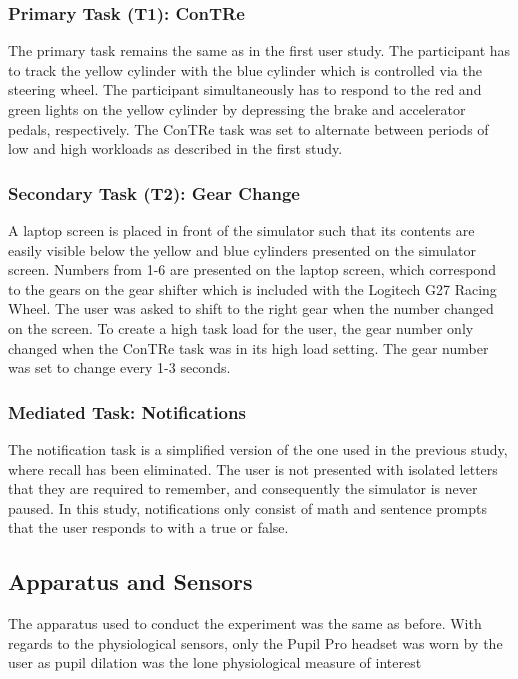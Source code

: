 \subsubsection{Primary Task (T1): ConTRe}
The primary task remains the same as in the first user study. The participant has to track the yellow cylinder with the blue cylinder which is controlled via the steering wheel. The participant simultaneously has to respond to the red and green lights on the yellow cylinder by depressing the brake and accelerator pedals, respectively. The ConTRe task was set to alternate between periods of low and high workloads as described in the first study. 


\subsubsection{Secondary Task (T2): Gear Change}
A laptop screen is placed in front of the simulator such that its contents are easily visible below the yellow and blue cylinders presented on the simulator screen. Numbers from 1-6 are presented on the laptop screen, which correspond to the gears on the gear shifter which is included with the Logitech G27 Racing Wheel. The user was asked to shift to the right gear when the number changed on the screen. To create a high task load for the user, the gear number only changed when the ConTRe task was in its high load setting. The gear number was set to change every 1-3 seconds. 

\subsubsection{Mediated Task: Notifications}
The notification task is a simplified version of the one used in the previous study, where recall has been eliminated. The user is not presented with isolated letters that they are required to remember, and consequently the simulator is never paused. In this study, notifications only consist of math and sentence prompts that the user responds to with a true or false.  

\subsection{Apparatus and Sensors}
The apparatus used to conduct the experiment was the same as before. With regards to the physiological sensors, only the Pupil Pro headset was worn by the user as pupil dilation was the lone physiological measure of interest

